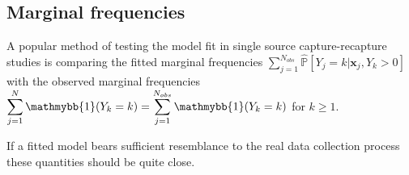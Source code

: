 \documentclass[
]{jss}
\newcommand{\1}{\mathmybb{1}} \newcommand{\bx}{\boldsymbol{x}}
\begin{document}
\hypertarget{marginal-frequencies}{%
\subsection{Marginal frequencies}\label{marginal-frequencies}}

A popular method of testing the model fit in single source
capture-recapture studies is comparing the fitted marginal frequencies
\(\displaystyle\sum_{j=1}^{N_{obs}}\hat{\mathbb{P}}\left[Y_{j}=k|\boldsymbol{x}_{j}, Y_{k} > 0\right]\)
with the observed marginal frequencies
\(\displaystyle\sum_{j=1}^{N}\mathmybb{1}(Y_{k}=k)=\sum_{j=1}^{N_{obs}}\mathmybb{1}(Y_{k}=k)\)
for \(k\geq1\).

If a fitted model bears sufficient resemblance to the real data
collection process these quantities should be quite close.
\end{document}
